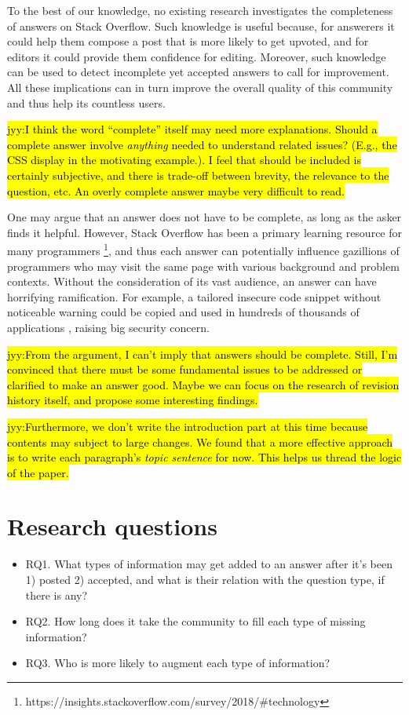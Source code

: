 \documentclass[10pt,conference]{IEEEtran}
\newcommand{\jyy}[1]{\sethlcolor{yellow}\hl{jyy:#1}\xspace}
\begin{document}
To the best of our knowledge, no existing research investigates the completeness of answers on Stack Overflow. Such knowledge is useful because, for answerers it could help them compose a post that is more likely to get upvoted, and for editors it could provide them confidence for editing. Moreover, such knowledge can be used to detect incomplete yet accepted answers to call for improvement. All these implications can in turn improve the overall quality of this community and thus help its countless users.

\jyy{I think the word ``complete'' itself may need more explanations. Should a complete answer involve \emph{anything} needed to understand related issues? (E.g., the CSS display in the motivating example.). I feel that should be included is certainly subjective, and there is trade-off between brevity, the relevance to the question, etc. An overly complete answer maybe very difficult to read.}

One may argue that an answer does not have to be complete, as long as the asker finds it helpful. However, Stack Overflow has been a primary learning resource for many programmers \footnote{https://insights.stackoverflow.com/survey/2018/\#technology}, and thus each answer can potentially influence gazillions of programmers who may visit the same page with various background and problem contexts. Without the consideration of its vast audience, an answer can have horrifying ramification. For example, a tailored insecure code snippet without noticeable warning could be copied and used in hundreds of thousands of applications \cite{DBLP:conf/sp/FischerBXSA0F17}, raising big security concern. 

\jyy{From the argument, I can't imply that answers should be complete. Still, I'm convinced that there must be some fundamental issues to be addressed or clarified to make an answer good. Maybe we can focus on the research of revision history itself, and propose some interesting findings.}

\jyy{Furthermore, we don't write the introduction part at this time because contents may subject to large changes. We found that a more effective approach is to write each paragraph's \emph{topic sentence} for now. This helps us thread the logic of the paper.}

\section {Research questions}
\begin{itemize}
  \item RQ1. What types of information may get added to an answer after it's been 1) posted 2) accepted, and what is their relation with the question type, if there is any?
  \item RQ2. How long does it take the community to fill each type of missing information?
  \item RQ3. Who is more likely to augment each type of information?
\end{itemize}
\end{document}
